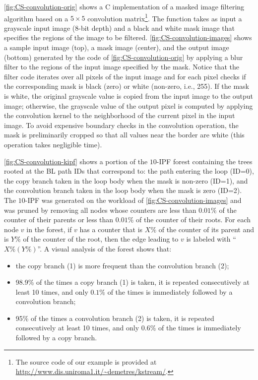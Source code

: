 \myfigure\ref{fig:CS-convolution-orig} shows a C implementation of a masked image filtering algorithm based on a $5\times 5$ convolution matrix\footnote{The source code of our example is provided at \url{http://www.dis.uniroma1.it/~demetres/kstream/}.}. The function takes as input a grayscale input image (8-bit depth) and a black and white mask image that specifies the regions of the image to be filtered. \myfigure\ref{fig:CS-convolution-images} shows a sample input image (top), a mask image (center), and the output image (bottom) generated by the code of \myfigure\ref{fig:CS-convolution-orig} by applying a blur filter to the regions of the input image specified by the mask. Notice that the filter code iterates over all pixels of the input image and for each pixel checks if the corresponding mask is black (zero) or white (non-zero, i.e., 255). If the mask is white, the original grayscale value is copied from the input image to the output image; otherwise, the grayscale value of the output pixel is computed by applying the convolution kernel to the neighborhood of the current pixel in the input image. To avoid expensive boundary checks in the convolution operation, the mask is preliminarily cropped so that all values near the border are white (this operation takes negligible time).

\myfigure\ref{fig:CS-convolution-kipf} shows a portion of the $10$-IPF forest containing the trees rooted at the BL path IDs that correspond to: the path entering the loop (ID=0), the copy branch taken in the loop body when the mask is non-zero (ID=1), and the convolution branch taken in the loop body when the mask is zero (ID=2). The $10$-IPF was generated on the workload of \myfigure\ref{fig:CS-convolution-images} and was pruned by removing all nodes whose counters are less than $0.01\%$ of the counter of their parents or less than $0.01\%$ of the counter of their roots. For each node $v$ in the forest, if $v$ has a counter that is $X\%$ of the counter of its parent and is $Y\%$ of the counter of the root, then the edge leading to $v$ is labeled with ``$X\% (Y\%)$''. A visual analysis of the forest shows that:
\begin{itemize}[itemsep=0pt,parsep=3pt]
\item the copy branch (1) is more frequent than the convolution branch (2);
\item 98.9\% of the times a copy branch (1) is taken, it is repeated consecutively at least 10 times, and only $0.1\%$ of the times is immediately followed by a convolution branch;
\item 95\% of the times a convolution branch (2) is taken, it is repeated consecutively at least 10 times, and only $0.6\%$ of the times is immediately followed by a copy branch.
\end{itemize}

